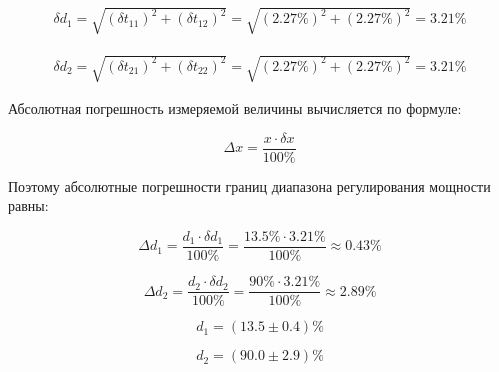 \begin{displaymath}
\begin{aligned}
	\delta d_1 = \sqrt{(\delta t_{11})^2 + (\delta t_{12})^2} = \sqrt{(2.27\%)^2 + (2.27\%)^2} = 3.21 \%
\end{aligned}
\end{displaymath}

\begin{displaymath}
\begin{aligned}
	\delta d_2 = \sqrt{(\delta t_{21})^2 + (\delta t_{22})^2} = \sqrt{(2.27\%)^2 + (2.27\%)^2} = 3.21 \%
\end{aligned}
\end{displaymath}

Абсолютная погрешность измеряемой величины вычисляется по формуле:

\begin{equation}
	\Delta x = \frac{x \cdot \delta x}{100 \%}
\end{equation}

Поэтому абсолютные погрешности границ диапазона регулирования мощности равны:

\begin{displaymath}
	\Delta d_1 = \frac{d_1 \cdot \delta d_1}{100 \%} = \frac{13.5 \% \cdot 3.21 \%}{100 \%} \approx 0.43 \%
\end{displaymath}

\begin{displaymath}
	\Delta d_2 = \frac{d_2 \cdot \delta d_2}{100 \%} = \frac{90 \% \cdot 3.21 \%}{100 \%} \approx 2.89 \%
\end{displaymath}

\begin{displaymath}
	d_1 = (13.5 \pm 0.4)\%
\end{displaymath}

\begin{displaymath}
	d_2 = (90.0 \pm 2.9)\%
\end{displaymath}


